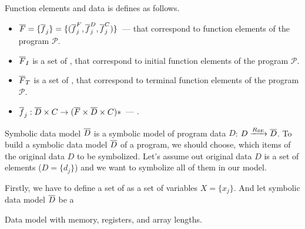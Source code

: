 Function elements and data is defines as follows.
\begin{itemize}
    \item $\overline{F} = \{\overline{f}_j\} =
        \{(\overline{f}_j^F, \overline{f}_j^D, \overline{f}_j^C)\}$~---
        that correspond to function elements of the program $\mathcal{P}$.
    \item $\overline{F}_I$ is a set of
        ,
        that correspond to initial function elements
        of the program $\mathcal{P}$.
    \item $\overline{F}_T$ is a set of
        ,
        that correspond to terminal function elements
        of the program $\mathcal{P}$.
    \item $\overline{f}_j: \overline{D} \times C \rightarrow
        (\overline{F} \times \overline{D} \times C)*$~---
        .
\end{itemize}


Symbolic data model $\overline{D}$ is a symbolic model of program data $D$:
$D \xrightarrow[]{R_\text{SE}} \overline{D}$.
To build a symbolic data model $\overline{D}$ of a program, we should choose,
which items of the original data $D$ to be symbolized.
Let's assume out original data $D$ is a set of elements ($D = \{d_j\}$)
and we want to symbolize all of them in our model.

Firstly, we have to define a set of
as a set of variables $X = \{x_j\}$.
And let symbolic data model $\overline{D}$ be a

Data model with memory, registers, and array lengths.

